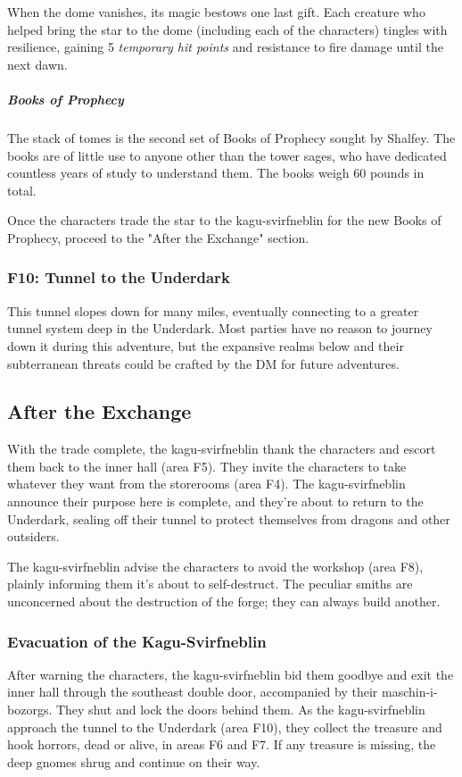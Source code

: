 \documentclass[10pt,a4paper,twoside,bg=print,twocolumn,openany,nodeprecatedcode]{dndbook}
\begin{document}
When the dome vanishes, its magic bestows one last gift. Each creature who helped bring the star to the dome (including each of the characters) tingles with resilience, gaining 5 \textit{temporary hit points} and resistance to fire damage until the next dawn.

\subparagraph{Books of Prophecy}
The stack of tomes is the second set of Books of Prophecy sought by Shalfey. The books are of little use to anyone other than the tower sages, who have dedicated countless years of study to understand them. The books weigh 60 pounds in total.

Once the characters trade the star to the kagu-svirfneblin for the new Books of Prophecy, proceed to the "After the Exchange" section.

\subsubsection{F10: Tunnel to the Underdark}
This tunnel slopes down for many miles, eventually connecting to a greater tunnel system deep in the Underdark. Most parties have no reason to journey down it during this adventure, but the expansive realms below and their subterranean threats could be crafted by the DM for future adventures.

\subsection{After the Exchange}
With the trade complete, the kagu-svirfneblin thank the characters and escort them back to the inner hall (area F5). They invite the characters to take whatever they want from the storerooms (area F4). The kagu-svirfneblin announce their purpose here is complete, and they're about to return to the Underdark, sealing off their tunnel to protect themselves from dragons and other outsiders.

The kagu-svirfneblin advise the characters to avoid the workshop (area F8), plainly informing them it's about to self-destruct. The peculiar smiths are unconcerned about the destruction of the forge; they can always build another.

\subsubsection{Evacuation of the Kagu-Svirfneblin}
After warning the characters, the kagu-svirfneblin bid them goodbye and exit the inner hall through the southeast double door, accompanied by their maschin-i-bozorgs. They shut and lock the doors behind them. As the kagu-svirfneblin approach the tunnel to the Underdark (area F10), they collect the treasure and hook horrors, dead or alive, in areas F6 and F7. If any treasure is missing, the deep gnomes shrug and continue on their way.
\end{document}

